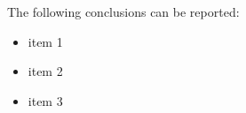 \documentclass[letterpaper,11pt]{texMemo}
\begin{document}
\maketitle

The following conclusions can be reported:
	
\begin{itemize}
 \item item 1
 \item item 2
 \item item 3
\end{itemize}


\end{document}
